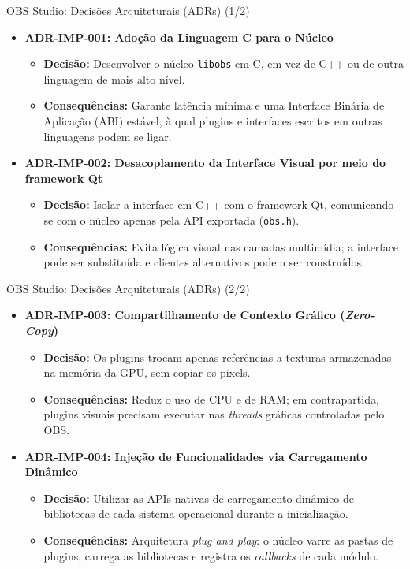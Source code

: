 \documentclass[aspectratio=169]{beamer}
\begin{document}
\begin{frame}{OBS Studio: Decisões Arquiteturais (ADRs) (1/2)}
\begin{itemize}\setlength{\itemsep}{0.8em}
\item \textbf{ADR-IMP-001: Adoção da Linguagem C para o Núcleo}
  \begin{itemize}
  \item \textbf{Decisão:} Desenvolver o núcleo \texttt{libobs} em C, em vez de C++ ou de outra linguagem de mais alto nível.
  \item \textbf{Consequências:} Garante latência mínima e uma Interface Binária de Aplicação (ABI) estável, à qual plugins e interfaces escritos em outras linguagens podem se ligar.
  \end{itemize}
\item \textbf{ADR-IMP-002: Desacoplamento da Interface Visual por meio do framework Qt}
  \begin{itemize}
  \item \textbf{Decisão:} Isolar a interface em C++ com o framework Qt, comunicando-se com o núcleo apenas pela API exportada (\texttt{obs.h}).
  \item \textbf{Consequências:} Evita lógica visual nas camadas multimídia; a interface pode ser substituída e clientes alternativos podem ser construídos.
  \end{itemize}
\end{itemize}
\end{frame}

\begin{frame}{OBS Studio: Decisões Arquiteturais (ADRs) (2/2)}
\begin{itemize}\setlength{\itemsep}{0.8em}
\item \textbf{ADR-IMP-003: Compartilhamento de Contexto Gráfico (\textit{Zero-Copy})}
  \begin{itemize}
  \item \textbf{Decisão:} Os plugins trocam apenas referências a texturas armazenadas na memória da GPU, sem copiar os pixels.
  \item \textbf{Consequências:} Reduz o uso de CPU e de RAM; em contrapartida, plugins visuais precisam executar nas \textit{threads} gráficas controladas pelo OBS.
  \end{itemize}
\item \textbf{ADR-IMP-004: Injeção de Funcionalidades via Carregamento Dinâmico}
  \begin{itemize}
  \item \textbf{Decisão:} Utilizar as APIs nativas de carregamento dinâmico de bibliotecas de cada sistema operacional durante a inicialização.
  \item \textbf{Consequências:} Arquitetura \textit{plug and play}: o núcleo varre as pastas de plugins, carrega as bibliotecas e registra os \textit{callbacks} de cada módulo.
  \end{itemize}
\end{itemize}
\end{frame}
\end{document}
